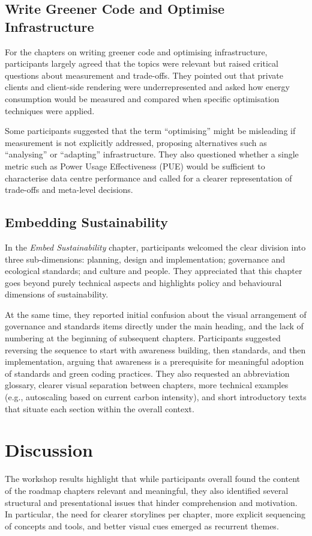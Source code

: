 \documentclass[english]{lni}
\begin{document}
\subsection{Write Greener Code and Optimise Infrastructure}
For the chapters on writing greener code and optimising infrastructure, participants largely agreed that the topics were relevant but raised critical questions about measurement and trade-offs. They pointed out that private clients and client-side rendering were underrepresented and asked how energy consumption would be measured and compared when specific optimisation techniques were applied.

Some participants suggested that the term \enquote{optimising} might be misleading if measurement is not explicitly addressed, proposing alternatives such as \enquote{analysing} or \enquote{adapting} infrastructure. They also questioned whether a single metric such as Power Usage Effectiveness (PUE) would be sufficient to characterise data centre performance and called for a clearer representation of trade-offs and meta-level decisions.

\subsection{Embedding Sustainability}
In the \emph{Embed Sustainability} chapter, participants welcomed the clear division into three sub-dimensions: planning, design and implementation; governance and ecological standards; and culture and people. They appreciated that this chapter goes beyond purely technical aspects and highlights policy and behavioural dimensions of sustainability.

At the same time, they reported initial confusion about the visual arrangement of governance and standards items directly under the main heading, and the lack of numbering at the beginning of subsequent chapters. Participants suggested reversing the sequence to start with awareness building, then standards, and then implementation, arguing that awareness is a prerequisite for meaningful adoption of standards and green coding practices. They also requested an abbreviation glossary, clearer visual separation between chapters, more technical examples (e.g., autoscaling based on current carbon intensity), and short introductory texts that situate each section within the overall context.

\section{Discussion}
The workshop results highlight that while participants overall found the content of the roadmap chapters relevant and meaningful, they also identified several structural and presentational issues that hinder comprehension and motivation. In particular, the need for clearer storylines per chapter, more explicit sequencing of concepts and tools, and better visual cues emerged as recurrent themes.
\end{document}

